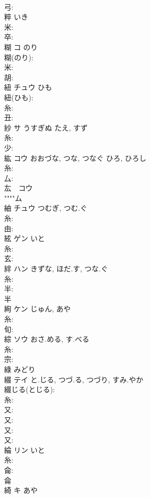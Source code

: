 \documentclass[8pt]{extreport}
\begin{document}
\begin{CJK}{UTF8}{min}
\\	弓: 
\\	粹		いき				
\\	米: 
\\	卒: 
\\	糊	コ	のり		
\\	糊(のり): 
\\	米: 
\\	胡: 
\\	紐	チュウ	ひも		
\\	紐(ひも): 
\\	糸: 
\\	丑: 
\\	紗	サ	うすぎぬ	たえ, すず	
\\	糸: 
\\	少: 
\\	紘	コウ	おおづな, つな, つなぐ	ひろ, ひろし	
\\	糸: 
\\	厶: 
\\	厷　コウ　
\\	""""ム
\\	紬	チュウ	つむぎ, つむ.ぐ		
\\	糸: 
\\	由: 
\\	絃	ゲン	いと		
\\	糸: 
\\	玄: 
\\	絆	ハン	きずな, ほだ.す, つな.ぐ		
\\	糸: 
\\	半: 
\\	半 
\\	絢	ケン		じゅん, あや	
\\	糸: 
\\	旬: 
\\	綜	ソウ	おさ.める, す.べる		
\\	糸: 
\\	宗: 
\\	綠		みどり				
\\	綴	テイ	と.じる, つづ.る, つづり, すみ.やか		
\\	綴じる(とじる): 
\\	糸: 
\\	又: 
\\	又: 
\\	又: 
\\	又: 
\\	綸	リン	いと		
\\	糸: 
\\	侖: 
\\	侖 
\\	綺	キ	あや		

\end{CJK}
\end{document}
